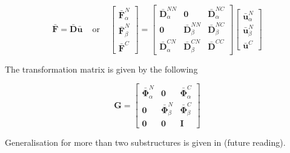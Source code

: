\documentclass[../DomainDecomposition.tex]{subfiles}
\begin{document}
\begin{equation}
    \bar{\mathbf{F}}
    =
    \bar{\mathbf{D}} 
    \bar{\mathbf{u}} 
    \phantom{xx} 
    \text{or}
    \phantom{xx} 
    \begin{bmatrix}
        \bar{\mathbf{F}}_{\alpha}^{N} \\ 
        \bar{\mathbf{F}}_{\beta}^{N} \\ 
        \bar{\mathbf{F}}^{C} 
    \end{bmatrix}
    =
    \begin{bmatrix}
        \bar{\mathbf{D}}_{\alpha}^{NN} & 
        \mathbf{0} & 
        \bar{\mathbf{D}}_{\alpha}^{NC} \\ 
        \mathbf{0} & 
        \bar{\mathbf{D}}_{\beta}^{NN} & 
        \bar{\mathbf{D}}_{\beta}^{NC} \\ 
        \bar{\mathbf{D}}_{\alpha}^{CN} & 
        \bar{\mathbf{D}}_{\beta}^{CN} & 
        \bar{\mathbf{D}}^{CC} 
    \end{bmatrix}
    \begin{bmatrix}
        \bar{\mathbf{u}}_{\alpha}^{N} \\ 
        \bar{\mathbf{u}}_{\beta}^{N} \\ 
        \bar{\mathbf{u}}^{C} 
    \end{bmatrix}
\label{Modal SoE} 
\end{equation}


The transformation matrix is given by the following 

\begin{equation}
    \mathbf{G} 
    = 
    \begin{bmatrix}
        \bar{\mathbf{\Phi}}_{\alpha}^{N} & 
        \mathbf{0} & 
        \bar{\mathbf{\Phi}}_{\alpha}^{C} \\
        \mathbf{0} & 
        \bar{\mathbf{\Phi}}_{\beta}^{N} & 
        \bar{\mathbf{\Phi}}_{\beta}^{C} \\
        \mathbf{0} & 
        \mathbf{0} & 
        \mathbf{I} 
    \end{bmatrix}
\end{equation}

Generalisation for more than two substructures is given in \cite{chatterjee2020uncertainty} (future reading). 
\end{document}
